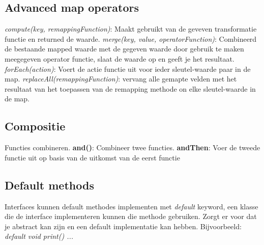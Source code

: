 \subsection{Advanced map operators}
\textit{compute(key, remappingFunction)}: Maakt gebruikt van de geveven transformatie functie en returned de waarde.
\textit{merge(key, value, operatorFunction)}: Combineerd de bestaande mapped waarde met de gegeven waarde door gebruik te maken meegegeven operator functie, slaat de waarde op en geeft je het resultaat.
\textit{forEach(action)}: Voert de actie functie uit voor ieder sleutel-waarde paar in de map.
\textit{replaceAll(remappingFunction)}: vervang alle gemapte velden met het resultaat van het toepassen van de remapping methode on elke sleutel-waarde in de map.

\subsection{Compositie}
Functies combineren.
\textbf{and()}: Combineer twee functies.
\textbf{andThen}: Voer de tweede functie uit op basis van de uitkomst van de eerst functie

\subsection{Default methods}
Interfaces kunnen default methodes implementen met \textit{default} keyword, een klasse die de interface implementeren kunnen die methode gebruiken.
Zorgt er voor dat je abstract kan zijn en een default implementatie kan hebben.
Bijvoorbeeld: \textit{default void print() { ... }}
